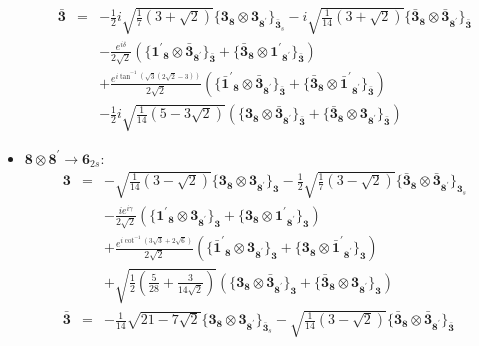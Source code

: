 \documentclass[english]{article}
\newcommand{\subcg}[3]{\big\{ {#1}\otimes{#2}\big\}^{}_{#3}}
\newcommand{\rep}[1]{\mathbf{#1}}
\begin{document}
\begin{itemize}
\begin{eqnarray*}
\\
\rep{\bar{3}} &=& -\frac{1}{2} i \sqrt{\frac{1}{7} \left(3+\sqrt{2}\right)}\subcg{\rep{3}_{\rep{8}}}{\rep{3}_{\rep{8^{\prime}}}}{\rep{\bar{3}}_{s}}-i \sqrt{\frac{1}{14} \left(3+\sqrt{2}\right)}\subcg{\rep{\bar{3}}_{\rep{8}}}{\rep{\bar{3}}_{\rep{8^{\prime}}}}{\rep{\bar{3}}} \\ 
 & & -\frac{e^{i \delta }}{2 \sqrt{2}}\left(\subcg{\rep{1^{\prime}}_{\rep{8}}}{\rep{\bar{3}}_{\rep{8^{\prime}}}}{\rep{\bar{3}}}+\subcg{\rep{\bar{3}}_{\rep{8}}}{\rep{1^{\prime}}_{\rep{8^{\prime}}}}{\rep{\bar{3}}}\right) \\ 
 & & +\frac{e^{i \tan ^{-1}\left(\sqrt{3} \left(2 \sqrt{2}-3\right)\right)}}{2 \sqrt{2}}\left(\subcg{\rep{\bar{1}^{\prime}}_{\rep{8}}}{\rep{\bar{3}}_{\rep{8^{\prime}}}}{\rep{\bar{3}}}+\subcg{\rep{\bar{3}}_{\rep{8}}}{\rep{\bar{1}^{\prime}}_{\rep{8^{\prime}}}}{\rep{\bar{3}}}\right) \\ 
 & & -\frac{1}{2} i \sqrt{\frac{1}{14} \left(5-3 \sqrt{2}\right)}\left(\subcg{\rep{3}_{\rep{8}}}{\rep{\bar{3}}_{\rep{8^{\prime}}}}{\rep{\bar{3}}}+\subcg{\rep{\bar{3}}_{\rep{8}}}{\rep{3}_{\rep{8^{\prime}}}}{\rep{\bar{3}}}\right)
\end{eqnarray*}
\item $\rep{8}\otimes\rep{8^{\prime}}\to\rep{6}_{2s}$:
\begin{eqnarray*}
\rep{3} &=& -\sqrt{\frac{1}{14} \left(3-\sqrt{2}\right)}\subcg{\rep{3}_{\rep{8}}}{\rep{3}_{\rep{8^{\prime}}}}{\rep{3}}-\frac{1}{2} \sqrt{\frac{1}{7} \left(3-\sqrt{2}\right)}\subcg{\rep{\bar{3}}_{\rep{8}}}{\rep{\bar{3}}_{\rep{8^{\prime}}}}{\rep{3}_{s}} \\ 
 & & -\frac{i e^{i \gamma }}{2 \sqrt{2}}\left(\subcg{\rep{1^{\prime}}_{\rep{8}}}{\rep{3}_{\rep{8^{\prime}}}}{\rep{3}}+\subcg{\rep{3}_{\rep{8}}}{\rep{1^{\prime}}_{\rep{8^{\prime}}}}{\rep{3}}\right) \\ 
 & & +\frac{e^{i \cot ^{-1}\left(3 \sqrt{3}+2 \sqrt{6}\right)}}{2 \sqrt{2}}\left(\subcg{\rep{\bar{1}^{\prime}}_{\rep{8}}}{\rep{3}_{\rep{8^{\prime}}}}{\rep{3}}+\subcg{\rep{3}_{\rep{8}}}{\rep{\bar{1}^{\prime}}_{\rep{8^{\prime}}}}{\rep{3}}\right) \\ 
 & & +\sqrt{\frac{1}{2} \left(\frac{5}{28}+\frac{3}{14 \sqrt{2}}\right)}\left(\subcg{\rep{3}_{\rep{8}}}{\rep{\bar{3}}_{\rep{8^{\prime}}}}{\rep{3}}+\subcg{\rep{\bar{3}}_{\rep{8}}}{\rep{3}_{\rep{8^{\prime}}}}{\rep{3}}\right)
\\
\rep{\bar{3}} &=& -\frac{1}{14} \sqrt{21-7 \sqrt{2}}\subcg{\rep{3}_{\rep{8}}}{\rep{3}_{\rep{8^{\prime}}}}{\rep{\bar{3}}_{s}}-\sqrt{\frac{1}{14} \left(3-\sqrt{2}\right)}\subcg{\rep{\bar{3}}_{\rep{8}}}{\rep{\bar{3}}_{\rep{8^{\prime}}}}{\rep{\bar{3}}} \\ 

\end{eqnarray*}
\end{itemize}
\end{document}

